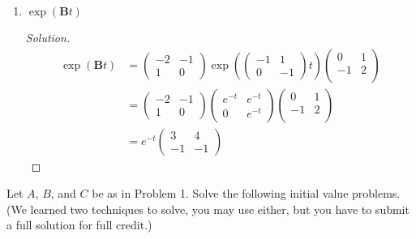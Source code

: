 \documentclass{article}
\newcommand{\paren}[1]{\left( #1 \right)}
\newenvironment{problem}[2][Problem]{\begin{trivlist}
\item[\hskip \labelsep {\bfseries #1}\hskip \labelsep {\bfseries #2.}]}{\end{trivlist}}
\newenvironment{solution}{\begin{proof}[Solution]}{\end{proof}}
\begin{document}
\begin{enumerate}
    \item[II] $\exp(\mathbf Bt)$
    \begin{solution}
        \begin{align*}
            \exp(\mathbf Bt) &= \begin{pmatrix}
                -2 & -1 \\
                1 & 0
            \end{pmatrix} \exp \paren{\begin{pmatrix}
                -1 & 1 \\
                0 & -1
            \end{pmatrix}t}
            \begin{pmatrix}
                0 & 1 \\
                -1 & 2 \\
            \end{pmatrix} \\
            &= \begin{pmatrix}
                -2 & -1 \\
                1 & 0
            \end{pmatrix}
            \begin{pmatrix}
                e^{-t} & e^{-t} \\
                0 & e^{-t}
            \end{pmatrix}
            \begin{pmatrix}
                0 & 1 \\
                -1 & 2 \\
            \end{pmatrix} \\
            &= e^{-t} \begin{pmatrix}
                3 & 4 \\
                -1 & -1
            \end{pmatrix}
        \end{align*}
        \end{solution}




\end{enumerate}


\begin{problem}{3}
    Let $A$, $B$, and $C$ be as in Problem 1. Solve the following initial value problems. (We learned two techniques to solve, you may use either, but you have to submit a full solution for full credit.)
\end{problem}
\end{document}

